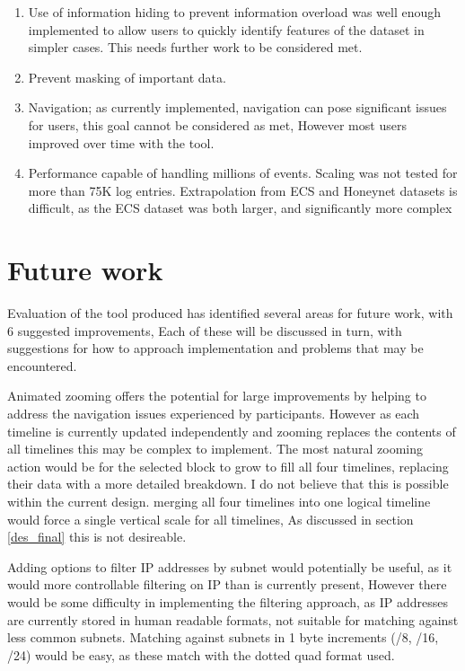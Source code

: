 \begin{enumerate}
\item{Use of information hiding to prevent information overload was well enough implemented to allow users to quickly identify features of the dataset in simpler cases. This needs further work to be considered met.}
\item{Prevent masking of important data.}
\item{Navigation; as currently implemented, navigation can pose significant issues for users, this goal cannot be considered as met, However most users improved over time with the tool.}
\item{Performance capable of handling millions of events. Scaling was not tested for more than 75K log entries. Extrapolation from ECS and Honeynet datasets is difficult, as the ECS dataset was both larger, and significantly more complex}
\end{enumerate}

\section{Future work}\label{eval_future}

Evaluation of the tool produced has identified several areas for future work, with 6 suggested improvements, Each of these will be discussed in turn, with suggestions for how to approach implementation and problems that may be encountered.

Animated zooming offers the potential for large improvements by helping to address the navigation issues experienced by participants. However as each timeline is currently updated independently and zooming replaces the contents of all timelines this may be complex to implement. The most natural zooming action would be for the selected block to grow to fill all four timelines, replacing their data with a more detailed breakdown. I do not believe that this is possible within the current design. merging all four timelines into one logical timeline would force a single vertical scale for all timelines, As discussed in section \ref{des_final} this is not desireable. 

Adding options to filter IP addresses by subnet would potentially be useful, as it would more controllable filtering on IP than is currently present, However there would be some difficulty in implementing the filtering approach, as IP addresses are currently stored in human readable formats, not suitable for matching against less common subnets. Matching against subnets in 1 byte increments (/8, /16, /24) would be easy, as these match with the dotted quad format used. 

